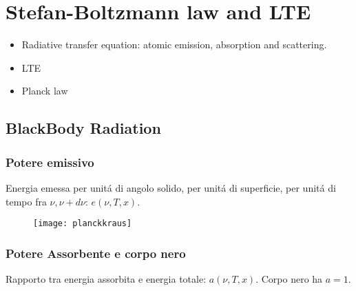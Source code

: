 \documentclass[main.tex]{subfiles}
\begin{document}
\part{Stefan-Boltzmann law and LTE}
\begin{itemize}
    \item Radiative transfer equation: atomic emission, absorption and scattering.
    \item LTE
     \item Planck law
\end{itemize}
\chapter{BlackBody Radiation}
\section{Potere emissivo}
Energia emessa per unit\'a di angolo solido, per unit\'a di superficie, per unit\'a di tempo fra $\nu,\nu+d\nu$: $e(\nu,T,x)$.
\begin{figure}
\texttt{[image: planckkraus]}
\label{planckkraus}
\end{figure}
\section{Potere Assorbente e corpo nero}
Rapporto tra energia assorbita e energia totale: $a(\nu,T,x)$. Corpo nero ha $a=1$.
\end{document}
